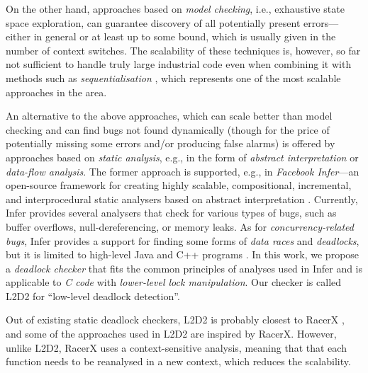\documentclass[runningheads]{llncs}
\begin{document}
On the other hand, approaches based on \emph{model checking}, i.e., exhaustive
state space exploration, can guarantee discovery of all potentially present
errors---either in general or at least up to some bound, which is usually given
in the number of context switches.
%
The scalability of these techniques is, however, so far not sufficient to handle
truly large industrial code even when combining it with methods such as
\emph{sequentialisation} \cite{lazy-seq-16}, 
%
%
which represents one of the most scalable approaches in the area.

An alternative to the above approaches, which can scale better than model
checking and can find bugs not found dynamically (though for the price of
potentially missing some errors and/or producing false alarms) is offered by
approaches based on \emph{static analysis}, e.g., in the form of \emph{abstract
interpretation} or \emph{data-flow analysis}.
%
The former approach is supported, e.g., in \emph{Facebook Infer}---an
open-source framework for creating highly scalable, compositional, incremental,
and interprocedural static analysers based on abstract interpretation
\cite{inferNFM15}.
%
%
%
Currently, Infer provides several analysers that check for various types of
bugs, such as buffer overflows, null-dereferencing, or memory leaks.
%
%
As for \emph{concurrency-related bugs}, Infer provides a support for finding
some forms of \emph{data races} and \emph{deadlocks}, but it is limited to
high-level Java and C++ programs \cite{racerD18,inferCACM19}.
%
In this work, we propose a \emph{deadlock checker} that fits the common
principles of analyses used in Infer and is applicable to \emph{C code} with
\emph{lower-level lock manipulation}.
%
Our checker is called L2D2 for ``low-level deadlock detection''.

\enlargethispage{6mm}

Out of existing static deadlock checkers, L2D2 is probably closest to RacerX
\cite{racerX03}, and some of the approaches used in L2D2 are inspired by RacerX.
%
However, unlike L2D2, RacerX uses a context-sensitive analysis, meaning that
that each function needs to be reanalysed in a new context, which reduces the
scalability.
\end{document}
